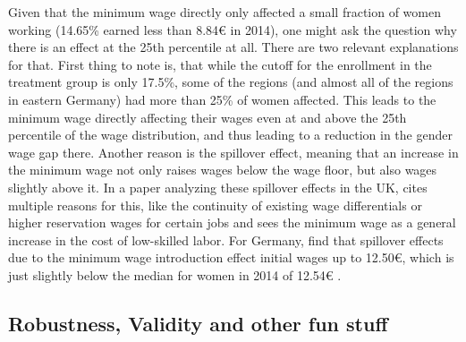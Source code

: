\documentclass[12pt,draft,a4paper]{article}
\begin{document}

Given that the minimum wage directly only affected a small fraction of women working (14.65\% earned less than 8.84€ in 2014), one might ask the question why there is an effect at the 25th percentile at all.
There are two relevant explanations for that.
First thing to note is, that while the cutoff for the enrollment in the treatment group is only 17.5\%,
some of the regions (and almost all of the regions in eastern Germany)
had more than 25\% of women affected. This leads to the minimum wage directly affecting their wages even at and above the 25th percentile of the wage distribution, and thus leading to a reduction in the gender wage gap there.
Another reason is the spillover effect, meaning that an increase in the minimum wage not only raises wages below the wage floor, but also wages slightly above it.
In a paper analyzing these spillover effects in the UK, \citet{Stewart12Wage} cites multiple reasons for this, like the continuity of existing wage differentials or higher reservation wages for certain jobs and sees the minimum wage as a general increase in the cost of low-skilled labor.
For Germany, \citet{Dustman21Reallocation} find that spillover effects due to the minimum wage introduction effect initial wages up to 12.50€, which is just slightly below the median for women in 2014 of 12.54€ \citep[see][Table 1]{CALIENDO22}. 
\subsection{Robustness, Validity and other fun stuff}







\end{document}
